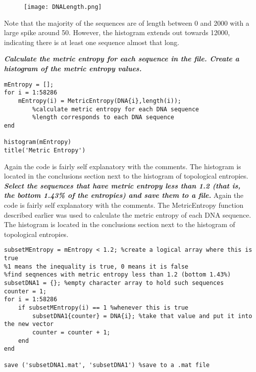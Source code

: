 \documentclass{article}
\begin{document}
\begin{figure}[H]
    \centering
    \texttt{[image: DNALength.png]}
    \label{fig:DNALength}
  \end{figure}
\noindent Note that the majority of the sequences are of length between 0 and 2000 with a large spike around 50.
However, the histogram extends out towards 12000, indicating there is at least one sequence almost that long.

\pagebreak

\noindent\textbf{\textit{Calculate the metric entropy for each sequence in the file. Create a histogram of the metric entropy values.}}
\newline
\begin{lstlisting}
mEntropy = [];
for i = 1:58286
    mEntropy(i) = MetricEntropy(DNA{i},length(i));
        %calculate metric entropy for each DNA sequence
        %length corresponds to each DNA sequence
end

histogram(mEntropy)
title('Metric Entropy')
\end{lstlisting}
Again the code is fairly self explanatory with the comments.
The histogram is located in the conclusions section next to the histogram of topological entropies.
\newline
\newline
\newline
\noindent\textbf{\textit{Select the sequences that have metric entropy less than 1.2 (that is, the bottom 1.43\% of the entropies) and save them to a file.}}
\newline
\newline
Again the code is fairly self explanatory with the comments.
The MetricEntropy function described earlier was used to calculate the metric entropy of each DNA sequence.
The histogram is located in the conclusions section next to the histogram of topological entropies.
\newline
\begin{lstlisting}
subsetMEntropy = mEntropy < 1.2; %create a logical array where this is true
%1 means the inequality is true, 0 means it is false
%find seqnences with metric entropy less than 1.2 (bottom 1.43%)
subsetDNA1 = {}; %empty character array to hold such sequences
counter = 1;
for i = 1:58286
    if subsetMEntropy(i) == 1 %whenever this is true
        subsetDNA1{counter} = DNA{i}; %take that value and put it into the new vector
        counter = counter + 1;
    end
end

save ('subsetDNA1.mat', 'subsetDNA1') %save to a .mat file
\end{lstlisting}
\end{document}
